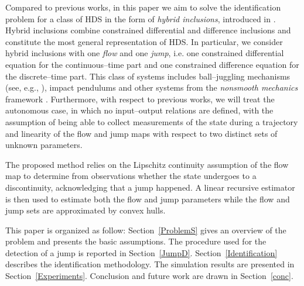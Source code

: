 Compared to previous works, in this paper we aim to solve the identification problem for a class of HDS in the form of \textit{hybrid inclusions}, introduced in \cite{goebel2009hybrid,Goebel2012}. Hybrid inclusions combine constrained differential and difference inclusions and constitute the most general representation of HDS. In particular, we consider hybrid inclusions with one \textit{flow} and one \textit{jump}, i.e. one constrained differential equation for the continuous--time part and one constrained difference equation for the discrete--time part. This class of systems includes ball--juggling mechanisms (see, e.g., \cite{tian2013}), impact pendulums and other systems from the \textit{nonsmooth mechanics} framework \cite{brogliato1999nonsmooth}. Furthermore, with respect to previous works, we will treat the autonomous case, in which no input--output relations are defined, with the assumption of being able to collect measurements of the state during a trajectory and linearity of the flow and jump maps with respect to two distinct sets of unknown parameters.  

The proposed method relies on the Lipschitz continuity assumption of the flow map to determine from observations whether the state undergoes to a discontinuity, acknowledging that a jump happened. 
A linear recursive estimator is then used to estimate both the flow and jump parameters while the flow and jump sets are approximated by convex hulls.

This paper is organized as follow: Section~\ref{ProblemS} gives an overview of the problem and presents the basic assumptions. The procedure used for the detection of a jump is reported in Section~\ref{JumpD}. Section~\ref{Identification} describes the identification methodology. The simulation results are presented in Section~\ref{Experiments}. Conclusion and future work are drawn in Section~\ref{conc}.

